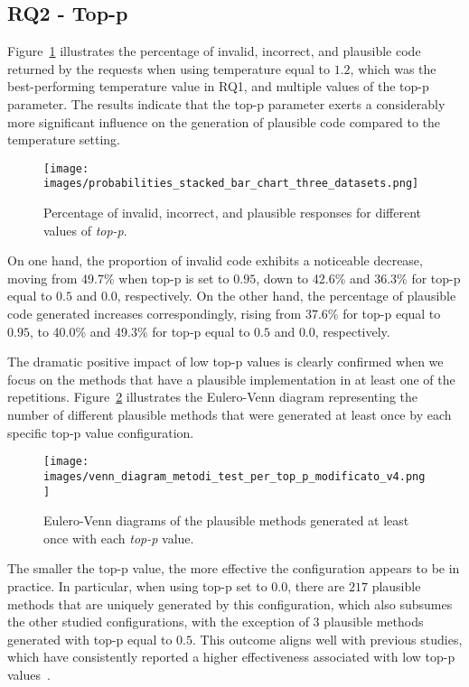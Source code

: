 \subsection{RQ2 - Top-p} 

Figure~\ref{fig:RequestsTopP} illustrates the percentage of invalid, incorrect, and plausible code returned by the requests when using temperature equal to $1.2$, which was the best-performing temperature value in RQ1, and multiple values of the top-p parameter. The results indicate that the top-p parameter exerts a considerably more significant influence on the generation of plausible code compared to the temperature setting. %

\begin{figure}[ht]
        \centering
        \texttt{[image: images/probabilities\_stacked\_bar\_chart\_three\_datasets.png]}
        \caption{Percentage of invalid, incorrect, and plausible responses for different values of \textit{top-p}.}
        \label{fig:RequestsTopP}
\end{figure}

On one hand, the proportion of invalid code exhibits a noticeable decrease, moving from 49.7\% when top-p is set to $0.95$, down to 42.6\% and 36.3\% for top-p equal to $0.5$ and $0.0$, respectively. On the other hand, the percentage of plausible code generated increases correspondingly, rising from 37.6\% for top-p equal to $0.95$, to 40.0\% and 49.3\% for top-p equal to $0.5$ and $0.0$, respectively.

The dramatic positive impact of low top-p values is clearly confirmed when we focus on the methods that have a plausible implementation in at least one of the repetitions.  Figure~\ref{fig:MethodsTopP} illustrates the Eulero-Venn diagram representing the number of different plausible methods that were generated at least once by each specific top-p value configuration. 

\begin{figure}[ht]
        \centering
        \texttt{[image: images/venn\_diagram\_metodi\_test\_per\_top\_p\_modificato\_v4.png]}
        \caption{Eulero-Venn diagrams of the plausible methods generated at least once with each \textit{top-p} value.}
        \label{fig:MethodsTopP}
\end{figure}

The smaller the top-p value, the more effective the configuration appears to be in practice. In particular, when using top-p set to $0.0$, there are $217$ plausible methods that are uniquely generated by this configuration, which also subsumes the other studied configurations, with the exception of $3$ plausible methods generated with top-p equal to $0.5$. This outcome aligns well with previous studies, which have consistently reported a higher effectiveness associated with low top-p values~\cite{arora2024optimizing}.

